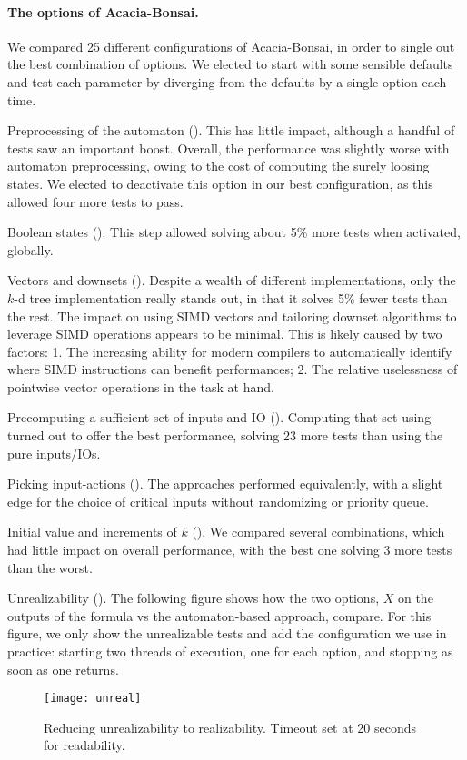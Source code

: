 \documentclass[runningheads,a4paper]{llncs}
\begin{document}
\paragraph{The options of Acacia-Bonsai.}  We compared 25 different
configurations of Acacia-Bonsai, in order to single out the best combination of
options.  We elected to start with some sensible defaults and test each
parameter by diverging from the defaults by a single option each time.
\begin{compactitem}
\item Preprocessing of the automaton ().  This has little
  impact, although a handful of tests saw an important boost.  Overall, the
  performance was slightly worse with automaton preprocessing, owing to the cost
  of computing the surely loosing states.  We elected to deactivate this option
  in our best configuration, as this allowed four more tests to pass.
\item Boolean states ().  This step allowed solving about
  5\% more tests when activated, globally.  
\item Vectors and downsets ().  Despite a wealth of different
  implementations, only the \(k\)-d tree implementation really stands out, in that
  it solves 5\% fewer tests than the rest.  The impact on using SIMD vectors and
  tailoring downset algorithms to leverage SIMD operations appears to be
  minimal.  This is likely caused by two factors: 1. The increasing ability for
  modern compilers to automatically identify where SIMD instructions can benefit
  performances; 2. The relative uselessness of pointwise vector operations in
  the task at hand.
\item Precomputing a sufficient set of inputs and IO ().
  Computing that set using  turned out to offer the best
  performance, solving 23 more tests than using the pure inputs/IOs.
\item Picking input-actions ().  The approaches performed
  equivalently, with a slight edge for the choice of critical inputs without
  randomizing or priority queue.
\item Initial value and increments of \(k\) ().  We compared several
  combinations, which had little impact on overall performance, with the best
  one solving 3 more tests than the worst.
\item Unrealizability (). The following figure shows how the
  two options, \(X\) on the outputs of the formula vs the automaton-based
  approach, compare.  For this figure, we only show the unrealizable tests and
  add the configuration we use in practice: starting two threads of execution,
  one for each option, and stopping as soon as one returns.
  \begin{figure}[h!]
    \centering
    \texttt{[image: unreal]}
    \caption{Reducing unrealizability to realizability.  Timeout set at 20
      seconds for readability.}
    \label{fig:unreal}
  \end{figure}


\end{compactitem}
\end{document}
